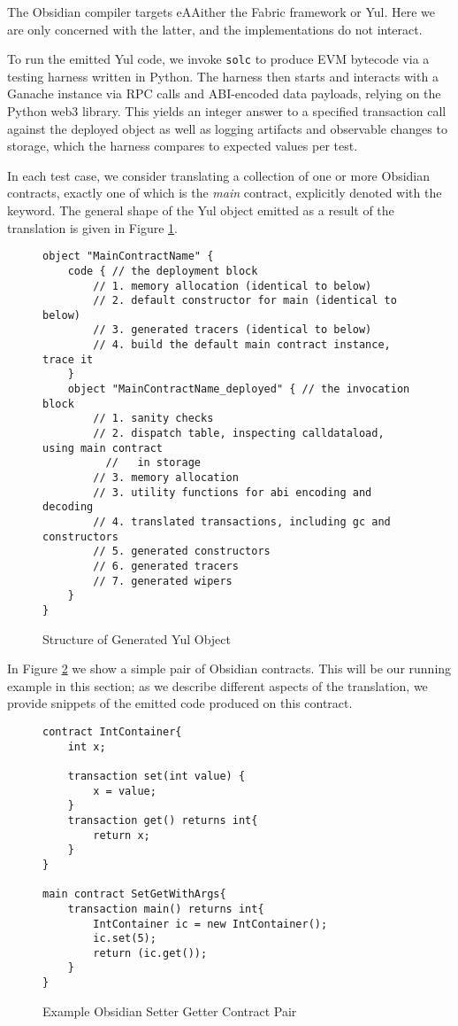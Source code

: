 The Obsidian compiler targets eAAither the Fabric framework or Yul. Here we
are only concerned with the latter, and the implementations do not
interact.

To run the emitted Yul code, we invoke \texttt{solc} to produce EVM
bytecode via a testing harness written in Python. The harness then starts
and interacts with a Ganache instance via RPC calls and ABI-encoded data
payloads, relying on the Python web3 library. This yields an integer answer
to a specified transaction call against the deployed object as well as
logging artifacts and observable changes to storage, which the harness
compares to expected values per test.

In each test case, we consider translating a collection of one or more
Obsidian contracts, exactly one of which is the \emph{main} contract,
explicitly denoted with the  keyword. The general shape of the
Yul object emitted as a result of the translation is given in
Figure \ref{code.1}.

\begin{figure}[hbtp]
    \caption{Structure of Generated Yul Object}
    \label{code.1}
    \begin{lstlisting}[language=yul,frame=single]
object "MainContractName" {
    code { // the deployment block
        // 1. memory allocation (identical to below)
        // 2. default constructor for main (identical to below)
        // 3. generated tracers (identical to below)
        // 4. build the default main contract instance, trace it
    }
    object "MainContractName_deployed" { // the invocation block
        // 1. sanity checks
        // 2. dispatch table, inspecting calldataload, using main contract
          //   in storage
        // 3. memory allocation
        // 3. utility functions for abi encoding and decoding
        // 4. translated transactions, including gc and constructors
        // 5. generated constructors
        // 6. generated tracers
        // 7. generated wipers
    }
}
    \end{lstlisting}
\end{figure}

In Figure \ref{code.2} we show a simple pair of Obsidian contracts. This
will be our running example in this section; as we describe different
aspects of the translation, we provide snippets of the emitted code
produced on this contract.

\begin{figure}[hbtp]
    \caption{Example Obsidian Setter Getter Contract Pair}
    \label{code.2}
    \begin{lstlisting}[language=obsidian,frame=single]
contract IntContainer{
    int x;

    transaction set(int value) {
        x = value;
    }
    transaction get() returns int{
        return x;
    }
}

main contract SetGetWithArgs{
    transaction main() returns int{
        IntContainer ic = new IntContainer();
        ic.set(5);
        return (ic.get());
    }
}
    \end{lstlisting}
\end{figure}



